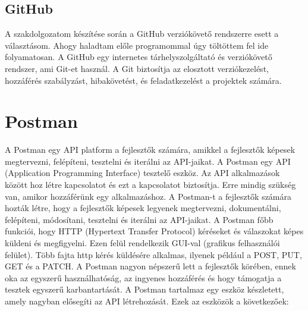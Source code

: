 \subsection{GitHub}
A szakdolgozatom készítése során a GitHub \cite{16} verziókövető rendszerre esett a választásom. Ahogy haladtam előle programommal úgy töltöttem fel ide folyamatosan. A GitHub egy internetes tárhelyszolgáltató és verziókövető rendszer, ami Git-et használ. A Git biztosítja az elosztott verziókezelést, hozzáférés szabályzást, hibakövetést, és feladatkezelést a projektek számára.

\section{Postman}
A Postman \cite{17} egy API platform a fejlesztők számára, amikkel a fejlesztők képesek megtervezni, felépíteni, tesztelni és iterálni az API-jaikat.
A Postman egy API (Application Programming Interface) tesztelő eszköz. Az API alkalmazások között hoz létre kapcsolatot és ezt a kapcsolatot biztosítja. Erre mindig szükség van, amikor hozzáférünk egy alkalmazáshoz. A Postman-t a fejlesztők számára hozták létre, hogy a fejlesztők képesek legyenek megtervezni, dokumentálni, felépíteni, módosítani, tesztelni és iterálni az API-jaikat. A Postman főbb funkciói, hogy HTTP (Hypertext Transfer Protocol) kéréseket és válaszokat képes küldeni és megfigyelni. Ezen felül rendelkezik GUI-val (grafikus felhasználói felület). Több fajta http kérés küldésére alkalmas, ilyenek például a POST, PUT, GET és a PATCH.
A Postman nagyon népszerű lett a fejlesztők körében, ennek oka az egyszerű használhatóság, az ingyenes hozzáférés és hogy támogatja a tesztek egyszerű karbantartását. 
A Postman \cite{18} tartalmaz egy eszköz készletett, amely nagyban elősegíti az API létrehozását. Ezek az eszközök a következőek:

